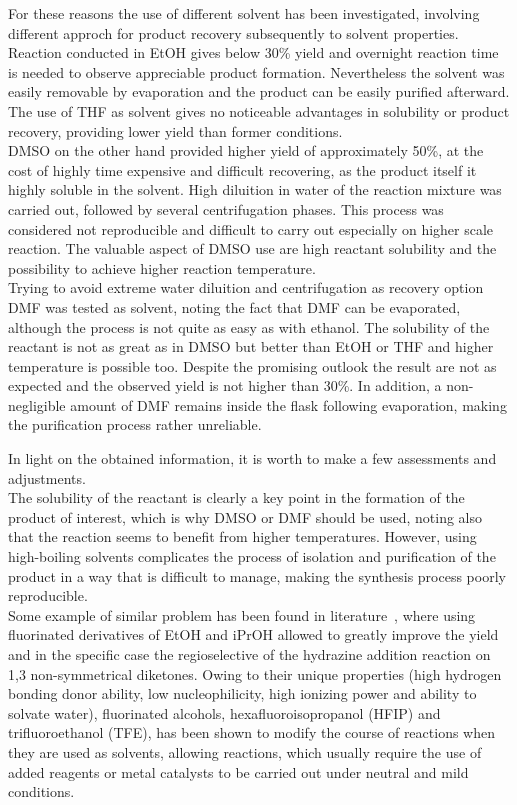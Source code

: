 \documentclass[../Master.tex]{subfiles}
\begin{document}
For these reasons the use of different solvent has been investigated, involving different approch for product recovery subsequently to solvent properties. \\
Reaction conducted in EtOH gives below 30\% yield and overnight reaction time is needed to observe appreciable product formation. Nevertheless the solvent was easily removable by evaporation and the product can be easily purified afterward.\\
The use of THF as solvent gives no noticeable advantages in solubility or product recovery, providing lower yield than former conditions.\\
DMSO on the other hand provided higher yield of approximately 50\%, at the cost of highly time expensive and difficult recovering, as the product itself it highly soluble in the solvent. High diluition in water of the reaction mixture was carried out, followed by several centrifugation phases. This process was considered not reproducible and difficult to carry out especially on higher scale reaction. The valuable aspect of DMSO use are high reactant solubility and the possibility to achieve higher reaction temperature.\\
Trying to avoid extreme water diluition and centrifugation as recovery option DMF was tested as solvent, noting the fact that DMF can be evaporated, although the process is not quite as easy as with ethanol. The solubility of the reactant is not as great as in DMSO but better than EtOH or THF and higher temperature is possible too. Despite the promising outlook the result are not as expected and the observed yield is not higher than 30\%. In addition, a non-negligible amount of DMF remains inside the flask following evaporation, making the purification process rather unreliable.

In light on the obtained information, it is worth to make a few assessments and adjustments.\\
The solubility of the reactant is clearly a key point in the formation of the product of interest, which is why DMSO or DMF should be used, noting also that the reaction seems to benefit from higher temperatures. However, using high-boiling solvents complicates the process of isolation and purification of the product in a way that is difficult to manage, making the synthesis process poorly reproducible.\\
Some example of similar problem has been found in literature\ \cite{fustero_improved_2008}, where using fluorinated derivatives of EtOH and iPrOH allowed to greatly improve the yield and in the specific case the regioselective of the hydrazine addition reaction on 1,3 non-symmetrical diketones. Owing to their unique properties (high hydrogen bonding donor ability, low nucleophilicity, high ionizing power and ability to solvate water), fluorinated alcohols, hexafluoroisopropanol (HFIP) and trifluoroethanol (TFE), has been shown to modify the course of reactions when they are used as solvents, allowing reactions, which usually require the use of added reagents or metal catalysts to be carried out under neutral and mild conditions.
\end{document}
